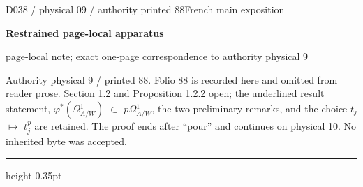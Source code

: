 \documentclass[9pt]{article}
\newcommand{\CanonText}[1]{\par{\fontsize{8.0}{9.35}\selectfont\RaggedRight #1\par}\vspace{2.2pt}}
\newcommand{\LayerTitle}{Restrained page-local apparatus}
\begin{document}
\noindent\begin{minipage}[t][\dimexpr\textheight-5pt\relax][t]{\textwidth}
{\sffamily\fontsize{7.3}{8.2}\selectfont\color{Quiet} D038 / physical 09 / authority printed 88\hfill French main exposition}
\par{}\vspace{4.5pt}
{\sffamily\fontsize{10.4}{11.6}\selectfont\bfseries\color{Accent} \LayerTitle}
\par{\sffamily\fontsize{6.7}{7.7}\selectfont\color{Quiet} page-local note; exact one-page correspondence to authority physical 9}
\vspace{5pt}
\CanonText{Authority physical 9 / printed 88. Folio 88 is recorded here and omitted from reader prose. Section 1.2 and Proposition 1.2.2 open; the underlined result statement, \(\varphi{}^{*}(\Omega{}^{1}_{A/W})\) \(\subset{}\) \(p\Omega{}^{1}_{A/W}\), the two preliminary remarks, and the choice \(t_{j}\) \(\mapsto{}\) \(t_{j}^{p}\) are retained. The proof ends after “pour” and continues on physical 10. No inherited byte was accepted.}
\vfill
{\color{Accent}\hrule height 0.35pt}\vspace{3pt}
\end{minipage}
\newpage
\end{document}
